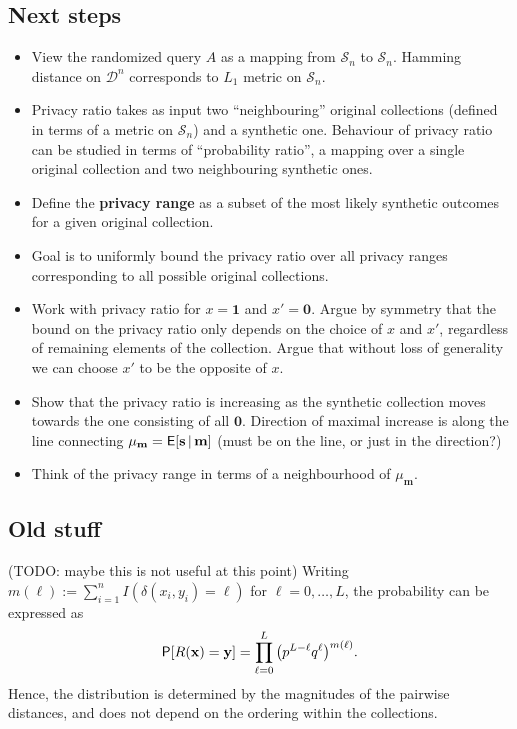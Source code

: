 \documentclass[11pt,draft]{article}
\newcommand{\Dsp}{\mathcal{D}}
\newcommand{\Ssp}{\mathcal{S}}
\newcommand{\xv}{\mathbf{x}}
\newcommand{\yv}{\mathbf{y}}
\newcommand{\sv}{\mathbf{s}}
\newcommand{\mv}{\mathbf{m}}
\newcommand{\one}{\boldsymbol{1}}
\newcommand{\zero}{\boldsymbol{0}}
\begin{document}
\hrulefill


\subsection{Next steps}

\begin{itemize}
\item
View the randomized query $A$ as a mapping from $\Ssp_n$ to $\Ssp_n$.
Hamming distance on $\Dsp^n$ corresponds to $L_1$ metric on $\Ssp_n$.

\item
Privacy ratio takes as input two ``neighbouring'' original collections (defined
in terms of a metric on $\Ssp_n$) and a synthetic one. Behaviour of privacy
ratio can be studied in terms of ``probability ratio'', a mapping over a single
original collection and two neighbouring synthetic ones.

\item
Define the \textbf{privacy range} as a subset of the most likely synthetic
outcomes for a given original collection.

\item
Goal is to uniformly bound the privacy ratio over all privacy ranges
corresponding to all possible original collections.

\item
Work with privacy ratio for $x = \one$ and $x' = \zero$. Argue by symmetry that
the bound on the privacy ratio only depends on the choice of $x$ and $x'$,
regardless of remaining elements of the collection.
Argue that without loss of generality we can choose $x'$ to be the opposite of
$x$.

\item
Show that the privacy ratio is increasing as the synthetic collection moves
towards the one consisting of all $\zero$.
Direction of maximal increase is along the line connecting $\mu_{\mv} =
\EP[\sv\given\mv]$ (must be on the line, or just in the direction?)

\item
Think of the privacy range in terms of a neighbourhood of $\mu_{\mv}$.
\end{itemize}

\hrulefill

\subsection{Old stuff}


(TODO: maybe this is not useful at this point)
Writing $m(\ell) := \sum_{i=1}^n I(\delta(x_i, y_i) = \ell)$ for
$\ell = 0,\dots,L$, the probability can be expressed as
\[ \P[R(\xv) = \yv] = \prod_{\ell = 0}^L \big(p^{L-\ell}q^\ell\big)^{m(\ell)}.
\]
Hence, the distribution is determined by the magnitudes of the pairwise
distances, and does not depend on the ordering within the collections.
\end{document}
